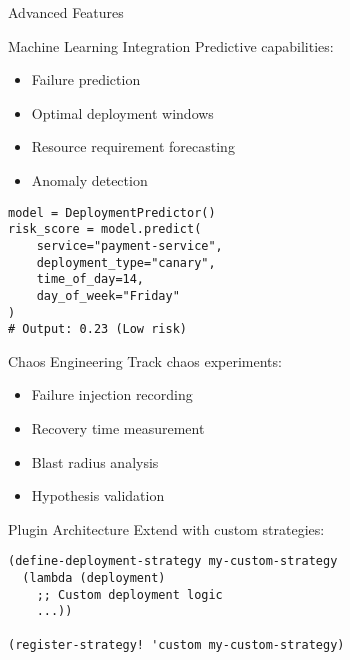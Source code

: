 \documentclass[presentation,aspectratio=169]{beamer}
\begin{document}
\begin{frame}[label={sec:orgb21b78e},fragile]{Advanced Features}
 \begin{block}{Machine Learning Integration}
Predictive capabilities:
\begin{itemize}
\item Failure prediction
\item Optimal deployment windows
\item Resource requirement forecasting
\item Anomaly detection
\end{itemize}

\begin{verbatim}
model = DeploymentPredictor()
risk_score = model.predict(
    service="payment-service",
    deployment_type="canary",
    time_of_day=14,
    day_of_week="Friday"
)
# Output: 0.23 (Low risk)
\end{verbatim}
\end{block}
\begin{block}{Chaos Engineering}
Track chaos experiments:
\begin{itemize}
\item Failure injection recording
\item Recovery time measurement
\item Blast radius analysis
\item Hypothesis validation
\end{itemize}
\end{block}
\begin{block}{Plugin Architecture}
Extend with custom strategies:

\begin{verbatim}
(define-deployment-strategy my-custom-strategy
  (lambda (deployment)
    ;; Custom deployment logic
    ...))

(register-strategy! 'custom my-custom-strategy)
\end{verbatim}
\end{block}
\end{frame}
\end{document}
